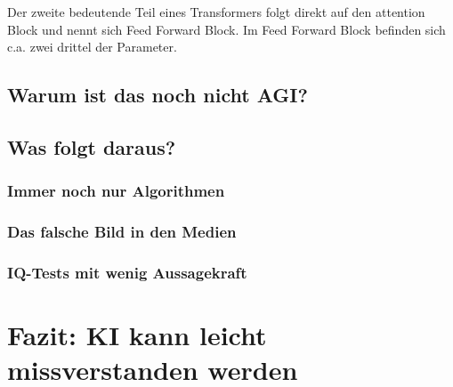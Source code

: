 	Der zweite bedeutende Teil eines Transformers folgt direkt auf den attention Block und nennt sich Feed Forward Block.
	Im Feed Forward Block befinden sich c.a. zwei drittel der Parameter.	 
	
	
	
	
	\subsection{Warum ist das noch nicht AGI?}\label{s2ss3}
	\subsection{Was folgt daraus?}\label{s2ss4}
		\subsubsection{Immer noch nur Algorithmen}\label{s2ss4sss1}
		\subsubsection{Das falsche Bild in den Medien}\label{s2ss4sss2}
		\subsubsection{IQ-Tests mit wenig Aussagekraft}\label{s2ss4sss3}
\section{Fazit: KI kann leicht missverstanden werden}\label{s3}